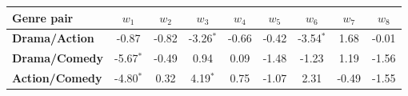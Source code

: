\begin{tabular}{|l|c|c|c|c|c|c|c|c|}
\hline
\textbf{Genre pair}&\textbf{$w_{1}$}&\textbf{$w_{2}$}&\textbf{$w_{3}$}&\textbf{$w_{4}$}&\textbf{$w_{5}$}&\textbf{$w_{6}$}&\textbf{$w_{7}$}&\textbf{$w_{8}$}\\\hline\hline
\textbf{Drama/Action}&-0.87&-0.82&-3.26$^*$&-0.66&-0.42&-3.54$^*$&1.68&-0.01\\\hline
\textbf{Drama/Comedy}&-5.67$^*$&-0.49&0.94&0.09&-1.48&-1.23&1.19&-1.56\\\hline
\textbf{Action/Comedy}&-4.80$^*$&0.32&4.19$^*$&0.75&-1.07&2.31&-0.49&-1.55\\\hline
\end{tabular}
